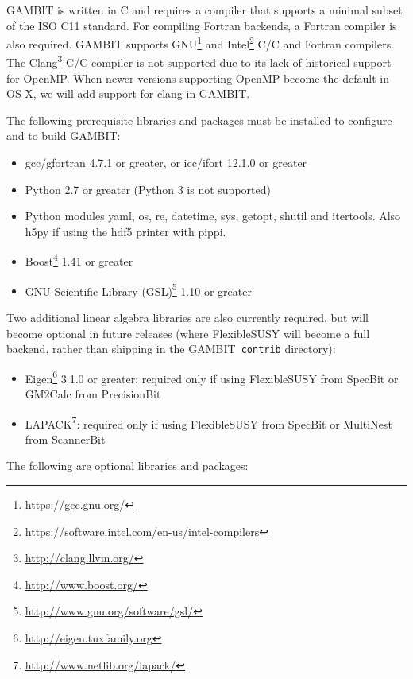 \documentclass[pdftex,twocolumn,epjc3_preprint,runningheads]{svjour3}
\renewcommand{\_}{\discretionary{\underscore}{}{\underscore}}
\newcommand\term[1]{{\lstset{style=terminal}\lstinline!#1!\lstset{style=cpp}}}
\newcommand{\gambit}{\textsf{GAMBIT}\xspace}
\newcommand{\specbit}{\textsf{SpecBit}\xspace}
\newcommand{\precisionbit}{\textsf{PrecisionBit}\xspace}
\newcommand{\scannerbit}{\textsf{ScannerBit}\xspace}
\newcommand{\GB}{\gambit}
\newcommand\flexiblesusy{\FlexibleSUSY}
\newcommand\FlexibleSUSY{\textsf{FlexibleSUSY}\xspace}
\newcommand\gmtwocalc{\textsf{GM2Calc}\xspace}
\newcommand\pippi{\textsf{pippi}\xspace}
\newcommand\xx{\raisebox{0.2ex}{\smaller ++}\xspace}
\newcommand\Cpp{\textsf{C\xx}\xspace}
\newcommand\Cppeleven{\textsf{C\raisebox{0.2ex}{\smaller ++}11}\xspace}
\newcommand\plainC{\textsf{C}\xspace}
\newcommand\Python{\textsf{Python}\xspace}
\newcommand\python{\Python}
\newcommand\Fortran{\textsf{Fortran}\xspace}
\renewcommand{\url}[1]{\href{#1}{#1}}
\begin{document}
\GB is written in \Cpp and requires a compiler that supports a minimal subset of the ISO \Cppeleven standard. For compiling \Fortran backends, a \Fortran compiler is also required. \GB supports GNU\footnote{\url{https://gcc.gnu.org/}} and Intel\footnote{\url{https://software.intel.com/en-us/intel-compilers}} \plainC/\Cpp and \Fortran compilers. The \textsf{Clang}\footnote{\url{http://clang.llvm.org/}} \plainC/\Cpp compiler is not supported due to its lack of historical support for \textsf{OpenMP}.  When newer versions supporting \textsf{OpenMP} become the default in OS X, we will add support for \textsf{clang} in \GB.

The following prerequisite libraries and packages must be installed to configure and to build \GB:
\begin{itemize}
  \item \textsf{gcc}/\textsf{gfortran 4.7.1} or greater, or \textsf{icc}/\textsf{ifort 12.1.0} or greater
  \item \textsf{Python 2.7} or greater (\textsf{Python 3} is not supported)
  \item \python modules \textsf{yaml}, \textsf{os}, \textsf{re}, \textsf{datetime}, \textsf{sys}, \textsf{getopt}, \textsf{shutil} and \textsf{itertools}.  Also \textsf{h5py} if using the \textsf{hdf5} printer with \pippi.
	\item \textsf{Boost}\footnote{\url{http://www.boost.org/}} \textsf{1.41} or greater
	\item GNU Scientific Library (\textsf{GSL})\footnote{\url{http://www.gnu.org/software/gsl/}} \textsf{1.10} or greater
\end{itemize}
Two additional linear algebra libraries are also currently required, but will become optional in future releases (where \flexiblesusy will become a full backend, rather than shipping in the \GB\ \term{contrib} directory):
\begin{itemize}
  \item \textsf{Eigen}\footnote{\url{http://eigen.tuxfamily.org}} \textsf{3.1.0} or greater: required only if using \flexiblesusy from \specbit or \gmtwocalc from \precisionbit
	\item \textsf{LAPACK}\footnote{\url{http://www.netlib.org/lapack/}}: required only if using \flexiblesusy from \specbit or \textsf{MultiNest} from \scannerbit
\end{itemize}
The following are optional libraries and packages:
\end{document}
